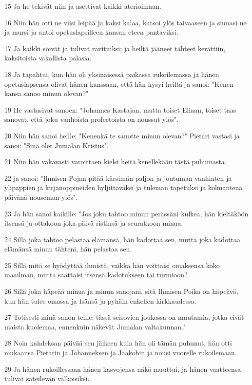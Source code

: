 \par 15 Ja he tekivät niin ja asettivat kaikki aterioimaan.
\par 16 Niin hän otti ne viisi leipää ja kaksi kalaa, katsoi ylös taivaaseen ja siunasi ne ja mursi ja antoi opetuslapsilleen kansan eteen pantaviksi.
\par 17 Ja kaikki söivät ja tulivat ravituiksi; ja heiltä jääneet tähteet kerättiin, kaksitoista vakallista palasia.
\par 18 Ja tapahtui, kun hän oli yksinäisessä paikassa rukoilemassa ja hänen opetuslapsensa olivat hänen kanssaan, että hän kysyi heiltä ja sanoi: "Kenen kansa sanoo minun olevan?"
\par 19 He vastasivat sanoen: "Johannes Kastajan, mutta toiset Eliaan, toiset taas sanovat, että joku vanhoista profeetoista on noussut ylös".
\par 20 Niin hän sanoi heille: "Kenenkä te sanotte minun olevan?" Pietari vastasi ja sanoi: "Sinä olet Jumalan Kristus".
\par 21 Niin hän vakavasti varoittaen kielsi heitä kenellekään tästä puhumasta
\par 22 ja sanoi: "Ihmisen Pojan pitää kärsimän paljon ja joutuman vanhinten ja ylipappien ja kirjanoppineiden hyljittäväksi ja tuleman tapetuksi ja kolmantena päivänä nouseman ylös".
\par 23 Ja hän sanoi kaikille: "Jos joku tahtoo minun perässäni kulkea, hän kieltäköön itsensä ja ottakoon joka päivä ristinsä ja seuratkoon minua.
\par 24 Sillä joka tahtoo pelastaa elämänsä, hän kadottaa sen, mutta joka kadottaa elämänsä minun tähteni, hän pelastaa sen.
\par 25 Sillä mitä se hyödyttää ihmistä, vaikka hän voittaisi omaksensa koko maailman, mutta saattaisi itsensä kadotukseen tai turmioon?
\par 26 Sillä joka häpeää minua ja minun sanojani, sitä Ihmisen Poika on häpeävä, kun hän tulee omassa ja Isänsä ja pyhäin enkelien kirkkaudessa.
\par 27 Totisesti minä sanon teille: tässä seisovien joukossa on muutamia, jotka eivät maista kuolemaa, ennenkuin näkevät Jumalan valtakunnan."
\par 28 Noin kahdeksan päivää sen jälkeen kuin hän oli tämän puhunut, hän otti mukaansa Pietarin ja Johanneksen ja Jaakobin ja nousi vuorelle rukoilemaan.
\par 29 Ja hänen rukoillessaan hänen kasvojensa näkö muuttui, ja hänen vaatteensa tulivat säteilevän valkoisiksi.
